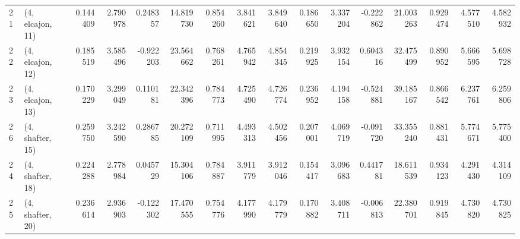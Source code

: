\begin{tabular}{llrrrrrrrrrrrrrr}
21 &  (4, elcajon, 11) &   0.144409 &  2.790978 &  0.248357 &   14.819730 &  0.854260 &   3.841621 &   3.849640 &  0.186650 &  3.337204 & -0.222862 &   21.003263 &  0.929474 &   4.577510 &   4.582932 \\
22 &  (4, elcajon, 12) &   0.185519 &  3.585496 & -0.922203 &   23.564662 &  0.768261 &   4.765942 &   4.854345 &  0.219925 &  3.932154 &  0.604316 &   32.475499 &  0.890952 &   5.666595 &   5.698728 \\
23 &  (4, elcajon, 13) &   0.170229 &  3.299049 &  0.110181 &   22.342396 &  0.784773 &   4.725490 &   4.726774 &  0.236952 &  4.194158 & -0.524881 &   39.185167 &  0.866542 &   6.237761 &   6.259806 \\
26 &  (4, shafter, 15) &   0.259750 &  3.242590 &  0.286785 &   20.272109 &  0.711995 &   4.493313 &   4.502456 &  0.207001 &  4.069719 & -0.091720 &   33.355240 &  0.881431 &   5.774671 &   5.775400 \\
24 &  (4, shafter, 18) &   0.224288 &  2.778984 &  0.045729 &   15.304106 &  0.784887 &   3.911779 &   3.912046 &  0.154417 &  3.096683 &  0.441781 &   18.611539 &  0.934123 &   4.291430 &   4.314109 \\
25 &  (4, shafter, 20) &   0.236614 &  2.936903 & -0.122302 &   17.470555 &  0.754776 &   4.177990 &   4.179779 &  0.170882 &  3.408711 & -0.006813 &   22.380701 &  0.919845 &   4.730820 &   4.730825 \\
\bottomrule
\end{tabular}
